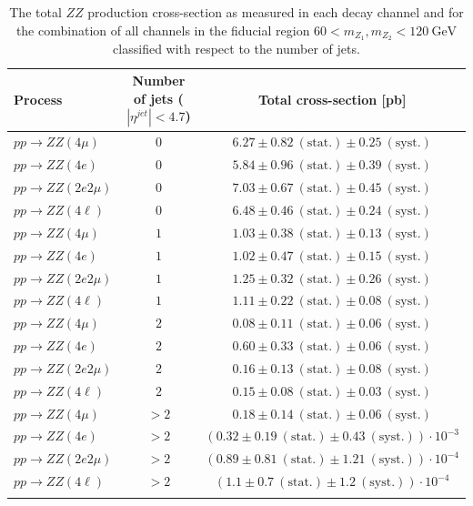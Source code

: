 \begin{table}[htbH]
\begin{center}
\caption{\footnotesize{The total $ZZ$ production cross-section as measured in each decay channel and for the combination of all channels in the fiducial region $60< m_{Z_{1}}, m_{Z_{2}} < 120~\mathrm{GeV}$ classified with respect to the number of jets.}}
\label{tab:xs_njets}
\begin{tabular}{lcc}
\hline Process & Number of jets ($|\eta^{jet}|<4.7$) &  Total cross-section [pb]\\
\hline $pp\to ZZ(4\mu) $ & $ 0 $ & $6.27\pm 0.82~\mathrm{(stat.)}\pm 0.25~\mathrm{(syst.)}$\\
$pp\to ZZ(4e) $ & $  0 $ & $5.84\pm 0.96~\mathrm{(stat.)}\pm 0.39~\mathrm{(syst.)}$\\
$pp\to ZZ(2e2\mu)$ & $ 0 $ &  $7.03\pm 0.67~\mathrm{(stat.)}\pm 0.45~\mathrm{(syst.)}$\\
\hline
\textbf{$pp\to ZZ(4\ell)$} & $0$ & $6.48 \pm 0.46~\mathrm{(stat.)}\pm 0.24~\mathrm{(syst.)}$ \\
\hline
$pp\to ZZ(4\mu) $ & $1$ & $1.03\pm 0.38~\mathrm{(stat.)}\pm 0.13~\mathrm{(syst.)}$\\
$pp\to ZZ(4e) $ &  $1$ & $1.02\pm 0.47~\mathrm{(stat.)}\pm 0.15~\mathrm{(syst.)}$\\
$pp\to ZZ(2e2\mu)$ & $1$ & $1.25\pm 0.32~\mathrm{(stat.)}\pm 0.26~\mathrm{(syst.)}$\\
\hline
\textbf{$pp\to ZZ(4\ell)$} & $1$ & $1.11 \pm 0.22~\mathrm{(stat.)}\pm 0.08~\mathrm{(syst.)}$ \\
\hline 
$pp\to ZZ(4\mu) $ & $2$ & $0.08\pm 0.11~\mathrm{(stat.)}\pm 0.06~\mathrm{(syst.)}$\\
$pp\to ZZ(4e) $ &  $2$ & $0.60\pm 0.33~\mathrm{(stat.)}\pm 0.06~\mathrm{(syst.)}$\\
$pp\to ZZ(2e2\mu)$ & $2$ & $0.16\pm 0.13~\mathrm{(stat.)}\pm 0.08~\mathrm{(syst.)}$\\
\hline
\textbf{$pp\to ZZ(4\ell)$} & $2$ & $0.15 \pm 0.08~\mathrm{(stat.)}\pm 0.03~\mathrm{(syst.)}$ \\
\hline 
$pp\to ZZ(4\mu) $ & $>2$ & $0.18\pm 0.14~\mathrm{(stat.)}\pm 0.06~\mathrm{(syst.)}$\\
$pp\to ZZ(4e) $ & $>2$ & $(0.32\pm 0.19~\mathrm{(stat.)}\pm 0.43~\mathrm{(syst.)}) \cdot 10^{-3}$\\
$pp\to ZZ(2e2\mu)$ & $>2$ & $(0.89 \pm 0.81~\mathrm{(stat.)}\pm 1.21~\mathrm{(syst.)})\cdot 10^{-4}$\\
\hline
\textbf{$pp\to ZZ(4\ell)$} & $>2$ & $(1.1\pm 0.7~\mathrm{(stat.)} \pm 1.2~\mathrm{(syst.)}) \cdot 10^{-4}$ \\
\hline \\
\end{tabular}%
\end{center}
\end{table}
